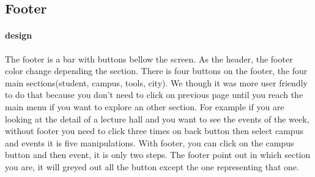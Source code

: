 \documentclass[11pt, a4paper]{report}
\begin{document}
\subsection{Footer}
\paragraph{design}
The footer is a bar with buttons bellow the screen. As the header, the footer color change depending the section. There is four buttons on the footer, the four main sections(student, campus, tools, city). We though it was more user friendly to do that because you don't need to click on previous page until you reach the main menu if you want to explore an other section. For example if you are looking at the detail of a lecture hall and you want to see the events of the week, without footer you need to click three times on back button then select campus and events it is five manipulations. With footer, you can click on the campus button and then event, it is only two steps. The footer point out in which section you are, it will greyed out all the button except the one representing that one.  
\end{document}
